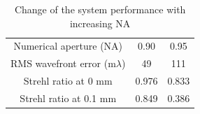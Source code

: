 \setlength{\arrayrulewidth}{.5mm}
\setlength{\tabcolsep}{18pt}
\renewcommand{\arraystretch}{1.2}
\begin{table}[h!]
    \centering
    \captionsetup{justification=centering}
    \caption{Change of the system performance with increasing NA}
    \label{table: NAchange}
    \vspace{-1em}
    \begin{tabular}{ c c c }
    \hline 
     Numerical aperture (NA) & 0.90 & 0.95\\ 
     \cmidrule{2-3}
    RMS wavefront error (m$\lambda$) & 49 & 111  \\ 
    Strehl ratio at 0 mm & 0.976 & 0.833\\
    Strehl ratio at 0.1 mm & 0.849 & 0.386\\
    \hline
    \end{tabular}
\end{table}

